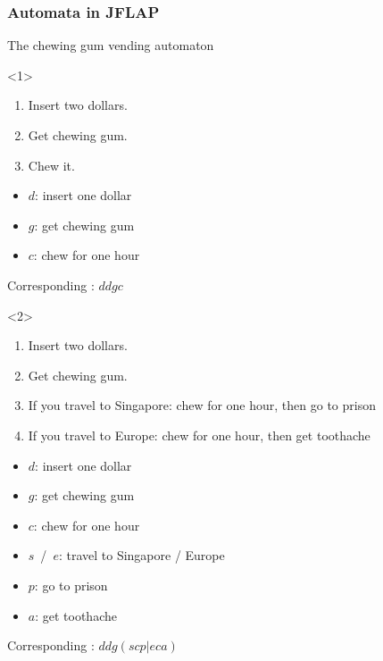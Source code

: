 \documentclass{beamer}
\begin{document}
\begin{frame}[fragile]\frametitle{Automata in JFLAP}

  The chewing gum vending automaton

  \begin{onlyenv}<1>
    \begin{enumerate}
    \item Insert two dollars.
    \item Get chewing gum.
    \item Chew it.
    \end{enumerate}


    \begin{itemize}
    \item $d$: insert one dollar
    \item $g$: get chewing gum
    \item $c$: chew for one hour
    \end{itemize}

    Corresponding : $ddgc$
  \end{onlyenv}

  \begin{onlyenv}<2>
    \begin{enumerate}
    \item Insert two dollars.
    \item Get chewing gum.
    \item If you travel to Singapore: chew for one hour, then go to prison
    \item If you travel to Europe: chew for one hour, then get toothache
    \end{enumerate}


    \begin{itemize}
    \item $d$: insert one dollar
    \item $g$: get chewing gum
    \item $c$: chew for one hour
    \item $s$~/~$e$: travel to Singapore / Europe
    \item $p$: go to prison
    \item $a$: get toothache
    \end{itemize}

    Corresponding : $ddg(scp|eca)$
  \end{onlyenv}



\end{frame}
\end{document}
